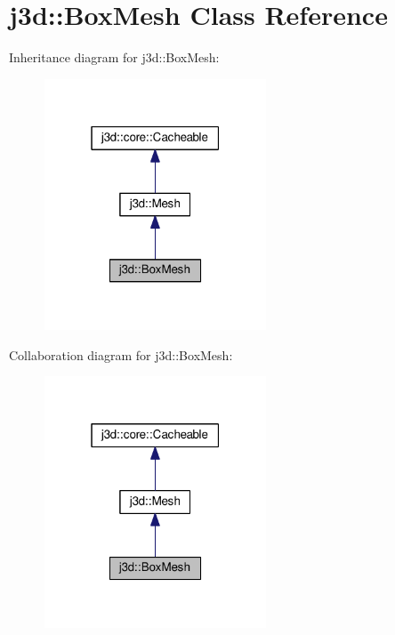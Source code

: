 \hypertarget{classj3d_1_1BoxMesh}{}\section{j3d\+:\+:Box\+Mesh Class Reference}
\label{classj3d_1_1BoxMesh}


Inheritance diagram for j3d\+:\+:Box\+Mesh\+:
\nopagebreak
\begin{figure}[H]
\begin{center}
\leavevmode
\includegraphics[width=187pt]{classj3d_1_1BoxMesh__inherit__graph}
\end{center}
\end{figure}


Collaboration diagram for j3d\+:\+:Box\+Mesh\+:
\nopagebreak
\begin{figure}[H]
\begin{center}
\leavevmode
\includegraphics[width=187pt]{classj3d_1_1BoxMesh__coll__graph}
\end{center}
\end{figure}
